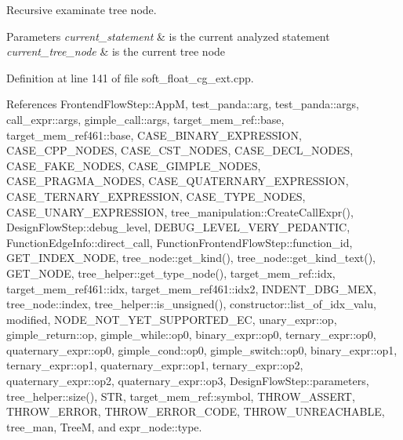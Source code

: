 Recursive examinate tree node. 


\begin{DoxyParams}{Parameters}
{\em current\+\_\+statement} & is the current analyzed statement \\
\hline
{\em current\+\_\+tree\+\_\+node} & is the current tree node \\
\hline
\end{DoxyParams}


Definition at line 141 of file soft\+\_\+float\+\_\+cg\+\_\+ext.\+cpp.



References Frontend\+Flow\+Step\+::\+AppM, test\+\_\+panda\+::arg, test\+\_\+panda\+::args, call\+\_\+expr\+::args, gimple\+\_\+call\+::args, target\+\_\+mem\+\_\+ref\+::base, target\+\_\+mem\+\_\+ref461\+::base, C\+A\+S\+E\+\_\+\+B\+I\+N\+A\+R\+Y\+\_\+\+E\+X\+P\+R\+E\+S\+S\+I\+ON, C\+A\+S\+E\+\_\+\+C\+P\+P\+\_\+\+N\+O\+D\+ES, C\+A\+S\+E\+\_\+\+C\+S\+T\+\_\+\+N\+O\+D\+ES, C\+A\+S\+E\+\_\+\+D\+E\+C\+L\+\_\+\+N\+O\+D\+ES, C\+A\+S\+E\+\_\+\+F\+A\+K\+E\+\_\+\+N\+O\+D\+ES, C\+A\+S\+E\+\_\+\+G\+I\+M\+P\+L\+E\+\_\+\+N\+O\+D\+ES, C\+A\+S\+E\+\_\+\+P\+R\+A\+G\+M\+A\+\_\+\+N\+O\+D\+ES, C\+A\+S\+E\+\_\+\+Q\+U\+A\+T\+E\+R\+N\+A\+R\+Y\+\_\+\+E\+X\+P\+R\+E\+S\+S\+I\+ON, C\+A\+S\+E\+\_\+\+T\+E\+R\+N\+A\+R\+Y\+\_\+\+E\+X\+P\+R\+E\+S\+S\+I\+ON, C\+A\+S\+E\+\_\+\+T\+Y\+P\+E\+\_\+\+N\+O\+D\+ES, C\+A\+S\+E\+\_\+\+U\+N\+A\+R\+Y\+\_\+\+E\+X\+P\+R\+E\+S\+S\+I\+ON, tree\+\_\+manipulation\+::\+Create\+Call\+Expr(), Design\+Flow\+Step\+::debug\+\_\+level, D\+E\+B\+U\+G\+\_\+\+L\+E\+V\+E\+L\+\_\+\+V\+E\+R\+Y\+\_\+\+P\+E\+D\+A\+N\+T\+IC, Function\+Edge\+Info\+::direct\+\_\+call, Function\+Frontend\+Flow\+Step\+::function\+\_\+id, G\+E\+T\+\_\+\+I\+N\+D\+E\+X\+\_\+\+N\+O\+DE, tree\+\_\+node\+::get\+\_\+kind(), tree\+\_\+node\+::get\+\_\+kind\+\_\+text(), G\+E\+T\+\_\+\+N\+O\+DE, tree\+\_\+helper\+::get\+\_\+type\+\_\+node(), target\+\_\+mem\+\_\+ref\+::idx, target\+\_\+mem\+\_\+ref461\+::idx, target\+\_\+mem\+\_\+ref461\+::idx2, I\+N\+D\+E\+N\+T\+\_\+\+D\+B\+G\+\_\+\+M\+EX, tree\+\_\+node\+::index, tree\+\_\+helper\+::is\+\_\+unsigned(), constructor\+::list\+\_\+of\+\_\+idx\+\_\+valu, modified, N\+O\+D\+E\+\_\+\+N\+O\+T\+\_\+\+Y\+E\+T\+\_\+\+S\+U\+P\+P\+O\+R\+T\+E\+D\+\_\+\+EC, unary\+\_\+expr\+::op, gimple\+\_\+return\+::op, gimple\+\_\+while\+::op0, binary\+\_\+expr\+::op0, ternary\+\_\+expr\+::op0, quaternary\+\_\+expr\+::op0, gimple\+\_\+cond\+::op0, gimple\+\_\+switch\+::op0, binary\+\_\+expr\+::op1, ternary\+\_\+expr\+::op1, quaternary\+\_\+expr\+::op1, ternary\+\_\+expr\+::op2, quaternary\+\_\+expr\+::op2, quaternary\+\_\+expr\+::op3, Design\+Flow\+Step\+::parameters, tree\+\_\+helper\+::size(), S\+TR, target\+\_\+mem\+\_\+ref\+::symbol, T\+H\+R\+O\+W\+\_\+\+A\+S\+S\+E\+RT, T\+H\+R\+O\+W\+\_\+\+E\+R\+R\+OR, T\+H\+R\+O\+W\+\_\+\+E\+R\+R\+O\+R\+\_\+\+C\+O\+DE, T\+H\+R\+O\+W\+\_\+\+U\+N\+R\+E\+A\+C\+H\+A\+B\+LE, tree\+\_\+man, TreeM, and expr\+\_\+node\+::type.



